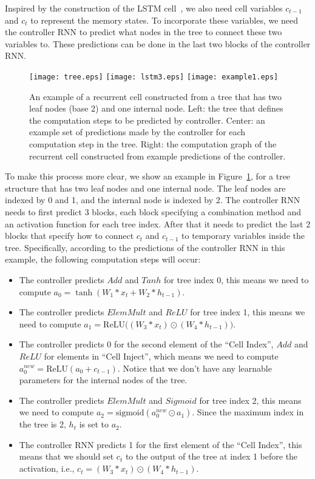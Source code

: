 \documentclass{article} \usepackage{iclr2017_conference,times}
\begin{document}
Inspired by the construction of the LSTM cell~\citep{lstm}, we also need cell variables $c_{t-1}$ and $c_t$ to represent the memory states. To incorporate these variables, we need the controller RNN to predict what nodes in the tree to connect these two variables to. These predictions can be done in the last two blocks of the controller RNN. 

\begin{figure}[h!]
\begin{center}
\texttt{[image: tree.eps]}
\texttt{[image: lstm3.eps]}
\texttt{[image: example1.eps]}
\caption{An example of a recurrent cell constructed from a tree that has two leaf nodes (base 2) and one internal node. Left: the tree that defines the computation steps to be predicted by controller. Center: an example set of predictions made by the controller for each computation step in the tree.  Right: the computation graph of the recurrent cell constructed from example predictions of the controller. }
\label{figure:RNN_Method}
\end{center}
\end{figure} 
To make this process more clear, we show an example in Figure~\ref{figure:RNN_Method}, for a tree structure that has two leaf nodes and one internal node. The leaf nodes are indexed by 0 and 1, and the internal node is indexed by 2. The controller RNN needs to first predict 3 blocks, each block specifying a combination method and an activation function for each tree index. After that it needs to predict the last 2 blocks that specify how to connect $c_t$ and $c_{t-1}$ to temporary variables inside the tree. Specifically, according to the predictions of the controller RNN in this example, the following computation steps will occur:
\begin{itemize}
\item The controller predicts $Add$ and $Tanh$ for tree index 0, this means we need to compute $a_0 = \tanh(W_1 * x_t + W_2 * h_{t-1})$. 
\item The controller predicts $Elem Mult$ and $ReLU$ for tree index 1, this means we need to compute $a_1 = \mathrm{ReLU}\big((W_3 * x_t) \odot (W_4 * h_{t-1})\big)$. 
\item The controller predicts 0 for the second element of the ``Cell Index'', $Add$ and $ReLU$ for elements in ``Cell Inject'', which means we need to compute $a_0^{new} = \mathrm{ReLU}(a_0 + c_{t-1})$. Notice that we don't have any learnable parameters for the internal nodes of the tree.
\item The controller predicts $Elem Mult$ and $Sigmoid$ for tree index 2, this means we need to compute $a_2 = \mathrm{sigmoid}( a_0^{new} \odot a_1)$. Since the maximum index in the tree is 2, $h_t$ is set to $a_2$.
\item The controller RNN predicts 1 for the first element of the ``Cell Index'', this means that we should set $c_t$ to the output of the tree at index 1 before the activation, i.e., $c_t = (W_3 * x_t) \odot (W_4 * h_{t-1})$.
\end{itemize}
\end{document}

